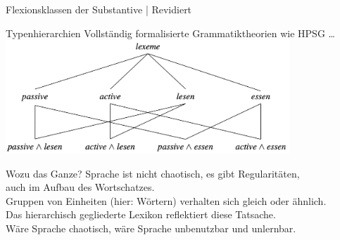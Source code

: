 \begin{frame}
  {Flexionsklassen der Substantive | Revidiert}
  \onslide<+->
  \onslide<+->
  \centering
\end{frame}

\begin{frame}
  {Typenhierarchien}
  \onslide<+->
  \onslide<+->
  Vollständig formalisierte Grammatiktheorien wie HPSG \citep{Mueller2013a} \ldots\\
  \Zeile
  \onslide<+->
  \includegraphics[width=0.8\textwidth]{graphics/typ_auto}\\
\end{frame}

\begin{frame}
  {Wozu das Ganze?}
  \onslide<+->
  \onslide<+->
  Sprache ist nicht chaotisch, es gibt \alert{Regularitäten}, \\
  auch im \alert{Aufbau des Wortschatzes}.\\
  \Zeile
  \onslide<+->
  \alert{Gruppen von Einheiten} (hier: Wörtern) verhalten sich gleich oder ähnlich.\\
  \Zeile
  \onslide<+->
  Das \alert{hierarchisch gegliederte Lexikon} reflektiert diese Tatsache.\\
  \Zeile
  \onslide<+->
  Wäre Sprache chaotisch, wäre Sprache unbenutzbar und unlernbar.
\end{frame}

